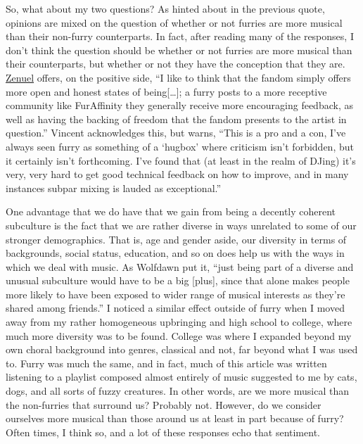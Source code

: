 So, what about my two questions? As hinted about in the previous quote,
opinions are mixed on the question of whether or not furries are more
musical than their non-furry counterparts. In fact, after reading many
of the responses, I don't think the question should be whether or not
furries are more musical than their counterparts, but whether or not
they have the conception that they are.
\href{http://www.furaffinity.net/user/zenuel/}{Zenuel} offers, on the
positive side, ``I like to think that the fandom simply offers more open
and honest states of being{[}\ldots{}{]}; a furry posts to a more
receptive community like FurAffinity they generally receive more
encouraging feedback, as well as having the backing of freedom that the
fandom presents to the artist in question.'' Vincent acknowledges this,
but warns, ``This is a pro and a con, I've always seen furry as
something of a `hugbox' where criticism isn't forbidden, but it
certainly isn't forthcoming. I've found that (at least in the realm of
DJing) it's very, very hard to get good technical feedback on how to
improve, and in many instances subpar mixing is lauded as exceptional.''

One advantage that we do have that we gain from being a decently
coherent subculture is the fact that we are rather diverse in ways
unrelated to some of our stronger demographics. That is, age and gender
aside, our diversity in terms of backgrounds, social status, education,
and so on does help us with the ways in which we deal with music. As
Wolfdawn put it, ``just being part of a diverse and unusual subculture
would have to be a big {[}plus{]}, since that alone makes people more
likely to have been exposed to wider range of musical interests as
they're shared among friends.'' I noticed a similar effect outside of
furry when I moved away from my rather homogeneous upbringing and high
school to college, where much more diversity was to be found. College
was where I expanded beyond my own choral background into genres,
classical and not, far beyond what I was used to. Furry was much the
same, and in fact, much of this article was written listening to a
playlist composed almost entirely of music suggested to me by cats,
dogs, and all sorts of fuzzy creatures. In other words, are we more
musical than the non-furries that surround us? Probably not. However, do
we consider ourselves more musical than those around us at least in part
because of furry? Often times, I think so, and a lot of these responses
echo that sentiment.

